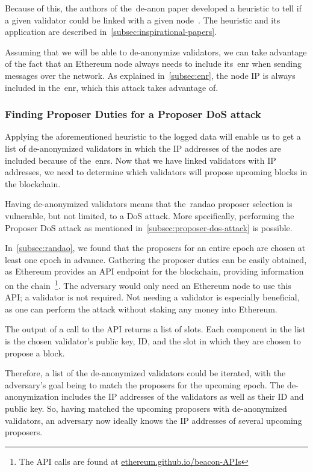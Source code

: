 Because of this, the authors of the~\gls{de-anon paper} developed a heuristic to tell if a given validator could be linked with a given node~\cite{heimbach2024deanonymizingethereumvalidatorsp2p}.
The heuristic and its application are described in~\autoref{subsec:inspirational-papers}.

Assuming that we will be able to de-anonymize validators, we can take advantage of the fact that an Ethereum node always needs to include its~\gls{enr} when sending messages over the network.
As explained in~\autoref{subsec:enr}, the node IP is always included in the~\gls{enr}, which this attack takes advantage of.

\subsubsection{Finding Proposer Duties for a Proposer DoS attack}
Applying the aforementioned heuristic to the logged data will enable us to get a list of de-anonymized validators in which the IP addresses of the nodes are included because of the~\glspl{enr}.
Now that we have linked validators with IP addresses, we need to determine which validators will propose upcoming blocks in the blockchain.

Having de-anonymized validators means that the~\gls{randao} proposer selection is vulnerable, but not limited, to a DoS attack.
More specifically, performing the Proposer DoS attack as mentioned in~\autoref{subsec:proposer-dos-attack} is possible.

In~\autoref{subsec:randao}, we found that the proposers for an entire epoch are chosen at least one epoch in advance.
Gathering the proposer duties can be easily obtained, as Ethereum provides an API endpoint for the blockchain, providing information on the chain~\footnote{The API calls are found at \href{https://ethereum.github.io/beacon-APIs/\#/Validator/getProposerDuties}{ethereum.github.io/beacon-APIs}}.
The adversary would only need an Ethereum node to use this API; a validator is not required.
Not needing a validator is especially beneficial, as one can perform the attack without staking any money into Ethereum.

The output of a call to the API returns a list of slots.
Each component in the list is the chosen validator's public key, ID, and the slot in which they are chosen to propose a block.

Therefore, a list of the de-anonymized validators could be iterated, with the adversary's goal being to match the proposers for the upcoming epoch.
The de-anonymization includes the IP addresses of the validators as well as their ID and public key.
So, having matched the upcoming proposers with de-anonymized validators, an adversary now ideally knows the IP addresses of several upcoming proposers.

